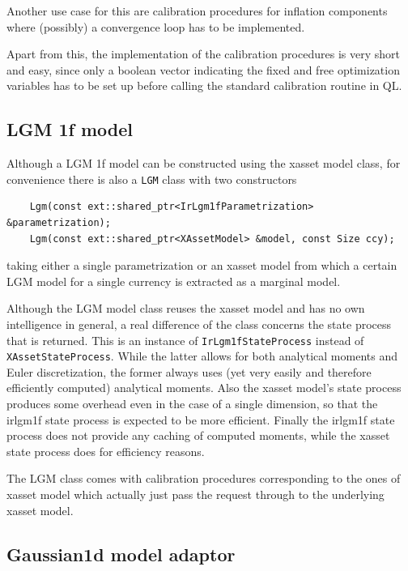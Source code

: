\documentclass[12pt, a4paper]{article}
\begin{document}
Another use case for this are calibration procedures for inflation components where (possibly) a convergence loop has to be implemented.

Apart from this, the implementation of the calibration procedures is very short and easy, since only a boolean vector indicating the fixed and free optimization variables has to be set up before calling the standard calibration routine in QL.

\subsection{LGM 1f model}

Although a LGM 1f model can be constructed using the xasset model class, for convenience there is also a \verb+LGM+ class with two constructors

\medskip
\scriptsize
\begin{verbatim}
    Lgm(const ext::shared_ptr<IrLgm1fParametrization> &parametrization);
    Lgm(const ext::shared_ptr<XAssetModel> &model, const Size ccy);
\end{verbatim}
\normalsize
\medskip

taking either a single parametrization or an xasset model from which a certain LGM model for a single currency is extracted as a marginal model.

Although the LGM model class reuses the xasset model and has no own intelligence in general, a real difference of the class concerns the state process that is returned. This is an instance of \verb+IrLgm1fStateProcess+ instead of \verb+XAssetStateProcess+. While the latter allows for both analytical moments and Euler discretization, the former always uses (yet very easily and therefore efficiently computed) analytical moments. Also the xasset model's state process produces some overhead even in the case of a single dimension, so that the irlgm1f state process is expected to be more efficient. Finally the irlgm1f state process does not provide any caching of computed moments, while the xasset state process does for efficiency reasons.

The LGM class comes with calibration procedures corresponding to the ones of xasset model which actually just pass the request through to the underlying xasset model.

\subsection{Gaussian1d model adaptor}
\end{document}
